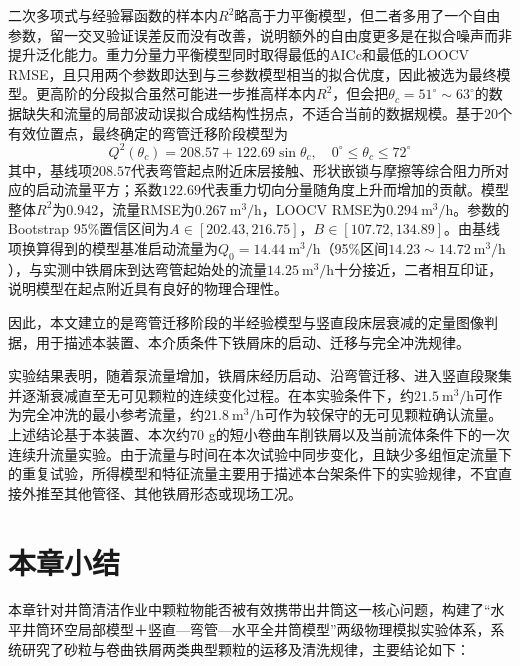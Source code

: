 二次多项式与经验幂函数的样本内$R^2$略高于力平衡模型，但二者多用了一个自由参数，留一交叉验证误差反而没有改善，说明额外的自由度更多是在拟合噪声而非提升泛化能力。重力分量力平衡模型同时取得最低的AICc和最低的LOOCV RMSE，且只用两个参数即达到与三参数模型相当的拟合优度，因此被选为最终模型。更高阶的分段拟合虽然可能进一步推高样本内$R^2$，但会把$\theta_c=51^\circ\sim63^\circ$的数据缺失和流量的局部波动误拟合成结构性拐点，不适合当前的数据规模。基于$20$个有效位置点，最终确定的弯管迁移阶段模型为
\begin{equation}
	Q^2(\theta_c) = 208.57 + 122.69\sin \theta_c, \quad 0^\circ \le \theta_c \le 72^\circ
	\label{eq:bend_model}
\end{equation}
其中，基线项$208.57$代表弯管起点附近床层接触、形状嵌锁与摩擦等综合阻力所对应的启动流量平方；系数$122.69$代表重力切向分量随角度上升而增加的贡献。模型整体$R^2$为$0.942$，流量RMSE为$0.267\ \mathrm{m^3/h}$，LOOCV RMSE为$0.294\ \mathrm{m^3/h}$。参数的Bootstrap 95\%置信区间为$A \in [202.43, 216.75]$，$B \in [107.72, 134.89]$。由基线项换算得到的模型基准启动流量为$Q_0 = 14.44\ \mathrm{m^3/h}$（95\%区间$14.23\sim14.72\ \mathrm{m^3/h}$），与实测中铁屑床到达弯管起始处的流量$14.25\ \mathrm{m^3/h}$十分接近，二者相互印证，说明模型在起点附近具有良好的物理合理性。

因此，本文建立的是弯管迁移阶段的半经验模型与竖直段床层衰减的定量图像判据，用于描述本装置、本介质条件下铁屑床的启动、迁移与完全冲洗规律。


实验结果表明，随着泵流量增加，铁屑床经历启动、沿弯管迁移、进入竖直段聚集并逐渐衰减直至无可见颗粒的连续变化过程。在本实验条件下，约$21.5\ \mathrm{m^3/h}$可作为完全冲洗的最小参考流量，约$21.8\ \mathrm{m^3/h}$可作为较保守的无可见颗粒确认流量。
上述结论基于本装置、本次约70 g的短小卷曲车削铁屑以及当前流体条件下的一次连续升流量实验。由于流量与时间在本次试验中同步变化，且缺少多组恒定流量下的重复试验，所得模型和特征流量主要用于描述本台架条件下的实验规律，不宜直接外推至其他管径、其他铁屑形态或现场工况。


\section{本章小结}

本章针对井筒清洁作业中颗粒物能否被有效携带出井筒这一核心问题，构建了“水平井筒环空局部模型＋竖直—弯管—水平全井筒模型”两级物理模拟实验体系，系统研究了砂粒与卷曲铁屑两类典型颗粒的运移及清洗规律，主要结论如下：


